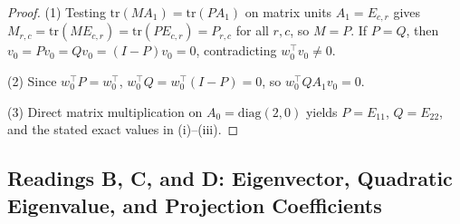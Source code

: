 \documentclass[11pt,a4paper]{article}
\theoremstyle{definition}
\newcommand{\tr}{\mathrm{tr}}
\newcommand{\diag}{\mathrm{diag}}
\begin{document}
\begin{proof}
(1) Testing $\tr(M A_1) = \tr(P A_1)$ on matrix units $A_1 = E_{c,r}$ gives
$M_{r,c} = \tr(M E_{c,r}) = \tr(P E_{c,r}) = P_{r,c}$ for all $r, c$, so $M = P$. If
$P = Q$, then $v_0 = P v_0 = Q v_0 = (I - P)v_0 = 0$, contradicting $w_0^\top v_0 \neq 0$.

(2) Since $w_0^\top P = w_0^\top$, $w_0^\top Q = w_0^\top (I - P) = 0$, so
$w_0^\top Q A_1 v_0 = 0$.

(3) Direct matrix multiplication on $A_0 = \diag(2, 0)$ yields $P = E_{11}$,
$Q = E_{22}$, and the stated exact values in (i)--(iii).
\end{proof}

\subsection{Readings B, C, and D: Eigenvector, Quadratic Eigenvalue, and Projection Coefficients}
\end{document}
